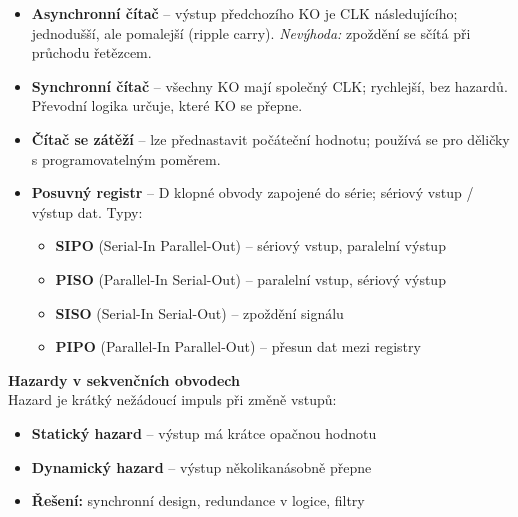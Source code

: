 \documentclass[a4paper,10pt]{article}
\begin{document}
\begin{vysvetlenibox}
\begin{itemize}[noitemsep, leftmargin=1.4em, topsep=4pt]
    \item \textbf{Asynchronní čítač} -- výstup předchozího KO je CLK
          následujícího; jednodušší, ale pomalejší (ripple carry).
          \textit{Nevýhoda:} zpoždění se sčítá při průchodu řetězcem.
    \item \textbf{Synchronní čítač} -- všechny KO mají společný CLK;
          rychlejší, bez hazardů. Převodní logika určuje, které KO se přepne.
    \item \textbf{Čítač se zátěží} -- lze přednastavit počáteční hodnotu;
          používá se pro děličky s programovatelným poměrem.
    \item \textbf{Posuvný registr} -- D klopné obvody zapojené do série;
          sériový vstup / výstup dat. Typy:
          \begin{itemize}[noitemsep, leftmargin=1em]
              \item \textbf{SIPO} (Serial-In Parallel-Out) -- sériový vstup, paralelní výstup
              \item \textbf{PISO} (Parallel-In Serial-Out) -- paralelní vstup, sériový výstup
              \item \textbf{SISO} (Serial-In Serial-Out) -- zpoždění signálu
              \item \textbf{PIPO} (Parallel-In Parallel-Out) -- přesun dat mezi registry
          \end{itemize}
\end{itemize}

\textbf{Hazardy v sekvenčních obvodech}\\
Hazard je krátký nežádoucí impuls při změně vstupů:
\begin{itemize}[noitemsep, leftmargin=1.4em, topsep=4pt]
    \item \textbf{Statický hazard} -- výstup má krátce opačnou hodnotu
    \item \textbf{Dynamický hazard} -- výstup několikanásobně přepne
    \item \textbf{Řešení:} synchronní design, redundance v logice, filtry
\end{itemize}
\end{vysvetlenibox}

\end{document}

